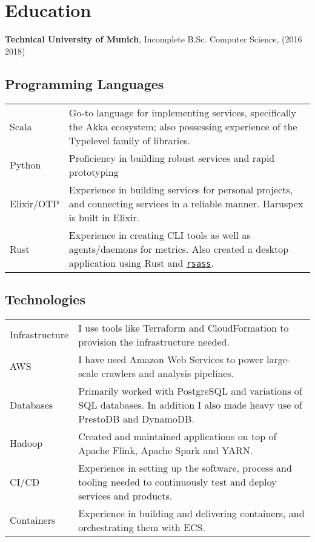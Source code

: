 \documentclass[a4paper]{article}
\renewenvironment{itemize}{
  \begin{list}{}{
      \setlength{\leftmargin}{1.5em}
      \setlength{\itemsep}{10pt}
  }
}{
  \end{list}
}
\begin{document}
\section*{Education}

\begin{itemize}
  \item \textbf{Technical University of Munich}, Incomplete B.Sc. Computer Science,  (2016
    {\textendash} 2018)
\end{itemize}

\subsection*{Programming Languages}
\begin{tabular}{ p{2.75cm} | p{14cm} }
Scala & Go-to language for implementing services, specifically the Akka ecosystem;
also possessing experience of the Typelevel family of libraries.\\
Python & Proficiency in building robust services and rapid prototyping \\
Elixir/OTP & Experience in building services for personal projects, and
connecting services in a reliable manner. Haruspex is built in Elixir.\\
Rust & Experience in creating CLI tools as well as agents/daemons for
metrics. Also created a desktop application using Rust and
\href{https://github.com/mordecaimalignatus/rsass}{\tt rsass}. \\
\end{tabular}

\subsection*{Technologies}
\begin{tabular}{ p{2.75cm} | p{14cm} }
Infrastructure & I use tools like Terraform and CloudFormation to
provision the infrastructure needed. \\
AWS & I have used Amazon Web Services to power large-scale crawlers and analysis
pipelines. \\
Databases & Primarily worked with PostgreSQL and variations of SQL
databases. In addition I also made heavy use of PrestoDB and DynamoDB.\\
Hadoop & Created and maintained applications on top of Apache Flink,
Apache Spark and YARN.\\
CI/CD & Experience in setting up the software, process and tooling needed
to continuously test and deploy services and products.\\
Containers & Experience in building and delivering containers, and orchestrating
them with ECS.
\end{tabular}
\end{document}
